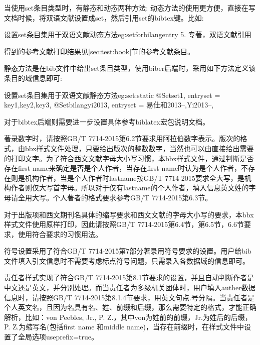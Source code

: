 \documentclass[11pt]{article} %
\begin{document}
当使用set条目类型时，有静态和动态两种方法:
动态方法的使用更方便，直接在写文档时候，将双语文献设置成set，然后引用set的bibtex键。比如:
\begin{codetex}{设置set条目集用于双语文献动态方法}{eg:setforbilangentry}
5. 专著，双语文献引用\cite{bilangyi2013}
\end{codetex}

得到的参考文献打印结果见\ref{sec:test:book}节的参考文献条目。

静态方法是在bib文件中给出set条目类型，使用biber后端时，采用如下方法定义该条目的域信息即可:
\begin{codetex}{设置set条目集用于双语文献静态方法}{eg:set:static}
@Set{set1,
entryset = {key1,key2,key3},
}
@Set{bilangyi2013,
entryset = {易仕和2013--,Yi2013--},
}
\end{codetex}
对于bibtex后端则需要进一步设置具体参考biblatex宏包说明文档。

\begin{property}{}{}
著录数字时，请按照GB/T 7714-2015第6.2节要求用阿拉伯数字表示。版次的格式，由bbx样式文件处理，只要给出版次的整数数字，当然也可以由直接给出需要的打印文字。为了符合西文文献字母大小写习惯，本bbx样式文件，通过判断是否存在first name来确定是否是个人作者，当存在first name时认为是个人作者，不存在则是机构作者，当是个人作者时lastname按GB/T 7714-2015要求全大写，是机构作者则仅大写首字母。所以对于仅有lastname的个人作者，填入信息英文姓的字母请全用大写。个人著者的格式要求参考GB/T 7714-2015第6.3节。
\end{property}

\begin{property}{}{}
对于出版项和西文期刊名具体的缩写要求和西文文献的字母大小写的要求，本bbx样式文件使用原样打印，因此请按照GB/T 7714-2015第6.4节，第6.5节，6.6节要求，使用符合要求的习惯用法。
\end{property}

\begin{property}{}{}
符号设置采用了符合GB/T 7714-2015第7部分著录用符号要求的设置。用户给bib文件填入引文信息时不需要考虑标点符号问题，只需录入各数据域的信息即可。
\end{property}

\begin{property}{}{}
责任者样式实现了符合GB/T 7714-2015第8.1节要求的设置，并且自动判断作者是中文还是英文，并分别处理。而当责任者为多级机关团体时，用户填入auther数据信息时，请按照GB/T 7714-2015第8.1.4节要求，用英文句点.号分隔。当责任者是个人英文名，且因为名具有名、姓、前缀和后缀，那么需要特定的格式，才能正确解析，比如：von Peebles, Jr., P. Z.，其中von为姓前的前缀，Jr.为姓后的后缀，P. Z.为缩写名(包括first name 和middle name)，当存在前缀时，在样式文件中设置了全局选项useprefix=true。
\end{property}
\end{document}
